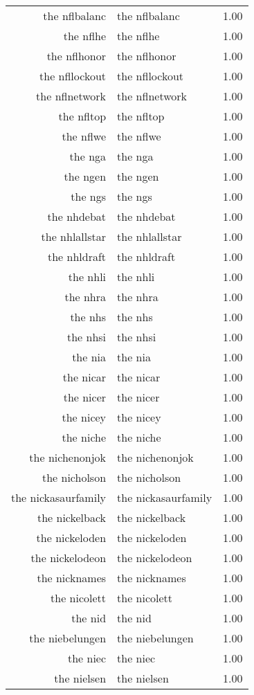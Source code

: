 \begin{table}[ht]
\begin{tabular}{rlr}
  the nflbalanc & the nflbalanc & 1.00 \\ 
  the nflhe & the nflhe & 1.00 \\ 
  the nflhonor & the nflhonor & 1.00 \\ 
  the nfllockout & the nfllockout & 1.00 \\ 
  the nflnetwork & the nflnetwork & 1.00 \\ 
  the nfltop & the nfltop & 1.00 \\ 
  the nflwe & the nflwe & 1.00 \\ 
  the nga & the nga & 1.00 \\ 
  the ngen & the ngen & 1.00 \\ 
  the ngs & the ngs & 1.00 \\ 
  the nhdebat & the nhdebat & 1.00 \\ 
  the nhlallstar & the nhlallstar & 1.00 \\ 
  the nhldraft & the nhldraft & 1.00 \\ 
  the nhli & the nhli & 1.00 \\ 
  the nhra & the nhra & 1.00 \\ 
  the nhs & the nhs & 1.00 \\ 
  the nhsi & the nhsi & 1.00 \\ 
  the nia & the nia & 1.00 \\ 
  the nicar & the nicar & 1.00 \\ 
  the nicer & the nicer & 1.00 \\ 
  the nicey & the nicey & 1.00 \\ 
  the niche & the niche & 1.00 \\ 
  the nichenonjok & the nichenonjok & 1.00 \\ 
  the nicholson & the nicholson & 1.00 \\ 
  the nickasaurfamily & the nickasaurfamily & 1.00 \\ 
  the nickelback & the nickelback & 1.00 \\ 
  the nickeloden & the nickeloden & 1.00 \\ 
  the nickelodeon & the nickelodeon & 1.00 \\ 
  the nicknames & the nicknames & 1.00 \\ 
  the nicolett & the nicolett & 1.00 \\ 
  the nid & the nid & 1.00 \\ 
  the niebelungen & the niebelungen & 1.00 \\ 
  the niec & the niec & 1.00 \\ 
  the nielsen & the nielsen & 1.00 \\ 

\end{tabular}
\end{table}
